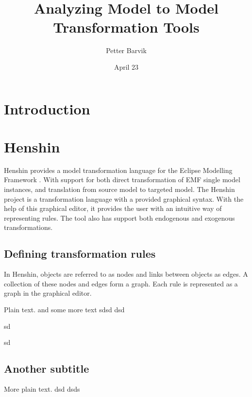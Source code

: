 \documentclass[pdftex,11pt,a4paper]{article}
\begin{document}
\title{Analyzing Model to Model Transformation
	   Tools}
\date{April 23}
\author{Petter Barvik}

\maketitle
{}
\section{Introduction}


\section{Henshin}

Henshin provides a model transformation language for the Eclipse Modelling
Framework \cite{Steinberg:2009:EEM:1197540}. With support for both direct 
transformation of EMF single model instances, and translation from source
model to targeted model. The Henshin project is a transformation language with a
provided graphical syntax. With the help of this graphical editor, it provides
the user with an intuitive way of representing rules. The tool also has support 
both endogenous and exogenous transformations.

\subsection{Defining transformation rules}

In Henshin, objects are referred to as nodes and links between objects as edges.
A collection of these nodes and edges form a graph. Each rule is represented as
a graph in the graphical editor.

Plain text. and some more text \cite{Taentzer2004}
sdsd  dsd

sd

sd

\subsection{Another subtitle}

More plain text.
dsd dsds 


 

\end{document}
